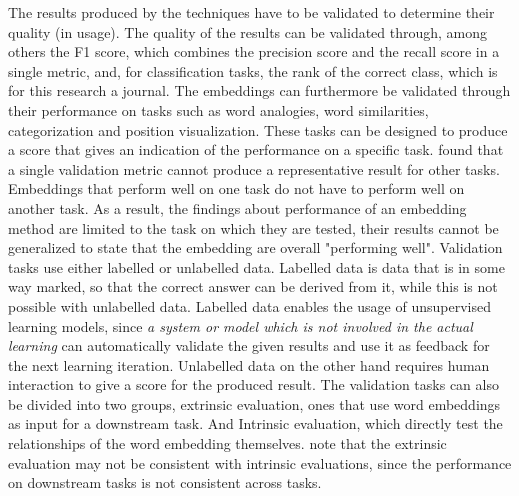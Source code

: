 \documentclass[../../Thesis.tex]{subfiles}
\begin{document}
The results produced by the techniques have to be validated to determine their quality (in usage). The quality of the results can be validated through, among others the F1 score, which combines the precision score and the recall score in a single metric, and, for classification tasks, the rank of the correct class, which is for this research a journal. The embeddings can furthermore be validated through their performance on tasks such as word analogies, word similarities, categorization and position visualization. These tasks can be designed to produce a score that gives an indication of the performance on a specific task. \citet{schnabel2015evaluation} found that a single validation metric cannot produce a representative result for other tasks. Embeddings that perform well on one task do not have to perform well on another task. As a result, the findings about performance of an embedding method are limited to the task on which they are tested, their results cannot be generalized to state that the embedding are overall "performing well". Validation tasks use either labelled or unlabelled data. Labelled data is data that is in some way marked, so that the correct answer can be derived from it, while this is not possible with unlabelled data. Labelled data enables the usage of unsupervised learning models, since  \textit{a system or model which is not involved in the actual learning} can automatically validate the given results and use it as feedback for the next learning iteration. Unlabelled data on the other hand requires human interaction to give a score for the produced result. The validation tasks can also be divided into two groups, extrinsic evaluation, ones that use word embeddings as input for a downstream task. And Intrinsic evaluation, which directly test the relationships of the word embedding themselves. \citet{schnabel2015evaluation} note that the extrinsic evaluation may not be consistent with intrinsic evaluations, since the performance on downstream tasks is not consistent across tasks.
\end{document}
